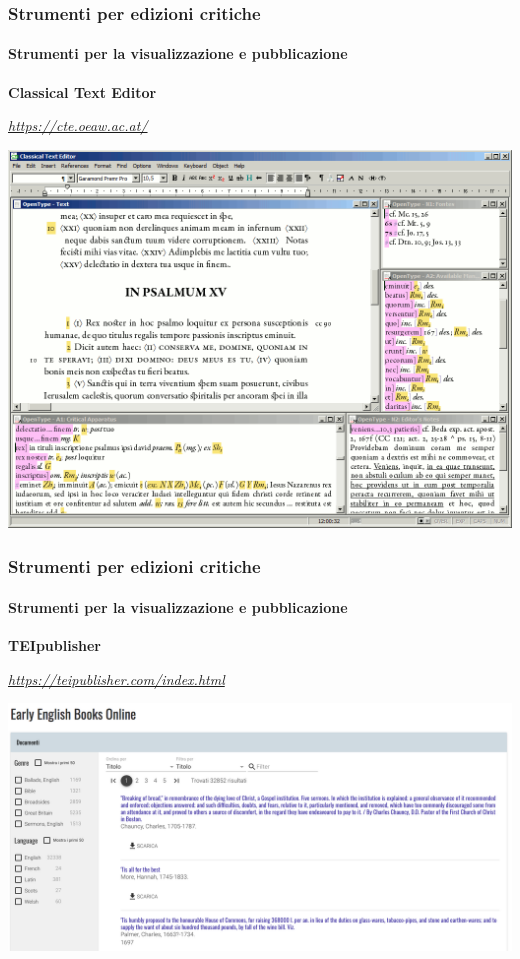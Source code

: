 \begin{frame}
    \frametitle{Strumenti per edizioni critiche}
    \framesubtitle{Strumenti per la visualizzazione e pubblicazione}
	\addtocounter{nframe}{1}
    \begin{center}
        \textbf{Classical Text Editor}
    \end{center}
    \begin{center}
        \textit{\url{https://cte.oeaw.ac.at/}}
	\end{center}
    \begin{center}
        \includegraphics[width=.95\textwidth]{imgs/cte.gif}
	\end{center}
\end{frame}

\begin{frame}
    \frametitle{Strumenti per edizioni critiche}
    \framesubtitle{Strumenti per la visualizzazione e pubblicazione}
	\addtocounter{nframe}{1}
    \begin{center}
        \textbf{TEIpublisher}
    \end{center}
    \begin{center}
        \textit{\url{https://teipublisher.com/index.html}}
	\end{center}
    \begin{center}
        \includegraphics[width=.95\textwidth]{imgs/teipublisher.png}
	\end{center}
\end{frame}

